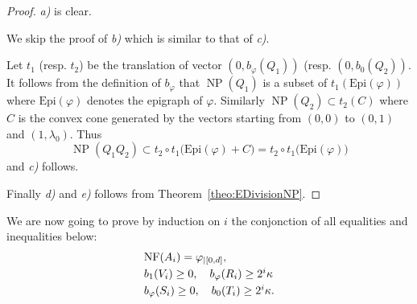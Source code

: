 \documentclass{sig-alternate-05-2015}
\DeclareMathOperator{\NP}{NP}
\newcommand{\NF}{\text{\rm NF}}
\newcommand{\Epi}{\textrm{Epi}}
\theoremstyle{definition}
\begin{document}
\begin{proof}
\emph{a)} is clear.

We skip the proof of \emph{b)} which is similar to that of \emph{c)}.

Let $t_1$ (resp. $t_2$) be the translation of vector $(0, b_\varphi
(Q_1))$ (resp. $(0, b_0(Q_2))$. It follows from the definition of
$b_\varphi$ that $\NP(Q_1)$ is a subset of $t_1(\Epi(\varphi))$ where
$\Epi(\varphi)$ denotes the epigraph of $\varphi$. Similarly $\NP(Q_2)
\subset t_2(C)$ where $C$ is the convex cone generated by the vectors 
starting from $(0,0)$ to $(0,1)$ and $(1, \lambda_0)$. Thus
$$\NP(Q_1 Q_2) \subset t_2 \circ t_1 \big(\Epi(\varphi) + C\big) =
t_2 \circ t_1\big(\Epi(\varphi)\big)$$
and \emph{c)} follows.

Finally \emph{d)} and \emph{e)} follows from
Theorem~\ref{theo:EDivisionNP}.
\end{proof}

We are now going to prove by induction on $i$ the conjonction of all
equalities and inequalities below:
\begin{equation}
\label{eq:induction}
\begin{array}{l}
\NF(A_i) = \varphi_{|[0,d]}, \smallskip \\
b_1(V_i) \geq 0, \quad
b_\varphi(R_i) \geq 2^i \kappa \smallskip \\
b_\varphi(S_i) \geq 0, \quad
b_0(T_i) \geq 2^i \kappa.
\end{array}
\end{equation}
\end{document}
